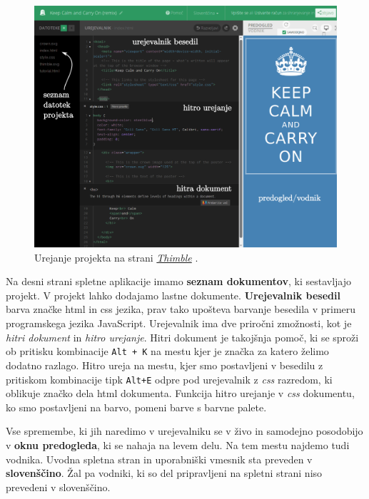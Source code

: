 \begin{figure}[h!]
  \centering
    \includegraphics [width=1\linewidth, keepaspectratio =
   1] {./images/sc_web/thimble_saup-v02.png}
   \caption{Urejanje projekta na strani
     \emph{\href{https://thimble.mozilla.org/sl/}{Thimble}}
     \cite{web:thimble}.}
   \label{fig:web:thimble:webapp}
 \end{figure}

 Na desni strani spletne aplikacije imamo \textbf{seznam dokumentov},
 ki sestavljajo projekt. V projekt lahko dodajamo lastne dokumente.
 \textbf{Urejevalnik besedil} barva značke html in css jezika, prav
 tako upošteva barvanje besedila v primeru programskega jezika
 JavaScript. Urejevalnik ima dve priročni zmožnosti, kot je
 \emph{hitri dokument} in \emph{hitro urejanje}. Hitri dokument je
 takojšnja pomoč, ki se sproži ob pritisku kombinacije \texttt{Alt +
   K} na mestu kjer je značka za katero želimo dodatno razlago. Hitro
 ureja na mestu, kjer smo postavljeni v besedilu z pritiskom
 kombinacije tipk \texttt{Alt+E} odpre pod urejevalnik z \emph{css}
 razredom, ki oblikuje značko dela html dokumenta. Funkcija hitro
 urejanje v \emph{css} dokumentu, ko smo postavljeni na barvo, pomeni
 barve s barvne palete.

 Vse spremembe, ki jih naredimo v urejevalniku se v živo in samodejno
 posodobijo v \textbf{oknu predogleda}, ki se nahaja na levem delu. Na
 tem mestu najdemo tudi vodnika.  Uvodna spletna stran in uporabniški
 vmesnik sta preveden v \textbf{slovenščino}. Žal pa vodniki, ki so
 del pripravljeni na spletni strani niso prevedeni v slovenščino.

